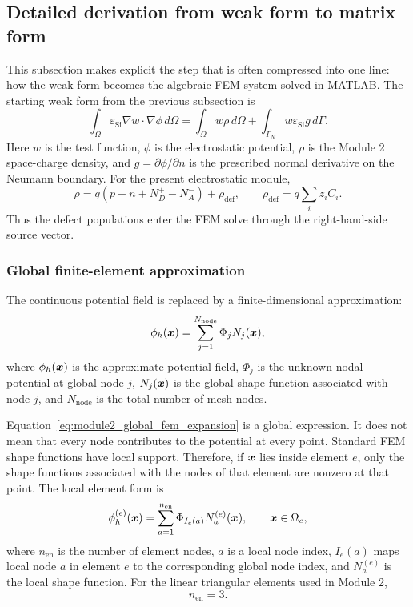 \documentclass[11pt]{article}
\begin{document}
\subsection{Detailed derivation from weak form to matrix form}

This subsection makes explicit the step that is often compressed into one line: how the weak form becomes the algebraic FEM system solved in MATLAB. The starting weak form from the previous subsection is
\begin{equation}
\int_{\Omega} \varepsilon_{\mathrm{Si}} \nabla w \cdot \nabla \phi \, d\Omega
= \int_{\Omega} w \rho \, d\Omega
+ \int_{\Gamma_N} w \varepsilon_{\mathrm{Si}} g \, d\Gamma .
\label{eq:module2_weak_form_before_discretization}
\end{equation}
Here $w$ is the test function, $\phi$ is the electrostatic potential, $\rho$ is the Module 2 space-charge density, and $g=\partial \phi/\partial n$ is the prescribed normal derivative on the Neumann boundary. For the present electrostatic module,
\begin{equation}
\rho
= q(p-n+N_D^+-N_A^-)+\rho_{\mathrm{def}},
\qquad
\rho_{\mathrm{def}} = q\sum_i z_i C_i .
\label{eq:module2_rho_for_matrix_derivation}
\end{equation}
Thus the defect populations enter the FEM solve through the right-hand-side source vector.

\subsubsection{Global finite-element approximation}

The continuous potential field is replaced by a finite-dimensional approximation:
\begin{equation}
\phi_h(\bm{x})
= \sum_{j=1}^{N_{\mathrm{node}}} \Phi_j N_j(\bm{x}),
\label{eq:module2_global_fem_expansion}
\end{equation}
where $\phi_h(\bm{x})$ is the approximate potential field, $\Phi_j$ is the unknown nodal potential at global node $j$, $N_j(\bm{x})$ is the global shape function associated with node $j$, and $N_{\mathrm{node}}$ is the total number of mesh nodes.

Equation~\eqref{eq:module2_global_fem_expansion} is a global expression. It does not mean that every node contributes to the potential at every point. Standard FEM shape functions have local support. Therefore, if $\bm{x}$ lies inside element $e$, only the shape functions associated with the nodes of that element are nonzero at that point. The local element form is
\begin{equation}
\phi_h^{(e)}(\bm{x})
= \sum_{a=1}^{n_{\mathrm{en}}} \Phi_{I_e(a)} N_a^{(e)}(\bm{x}),
\qquad \bm{x} \in \Omega_e,
\label{eq:module2_local_fem_expansion}
\end{equation}
where $n_{\mathrm{en}}$ is the number of element nodes, $a$ is a local node index, $I_e(a)$ maps local node $a$ in element $e$ to the corresponding global node index, and $N_a^{(e)}$ is the local shape function. For the linear triangular elements used in Module 2,
\begin{equation}
n_{\mathrm{en}}=3.
\end{equation}
\end{document}
